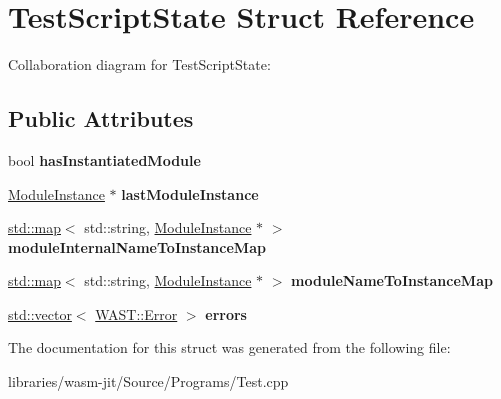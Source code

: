 \hypertarget{struct_test_script_state}{}\section{Test\+Script\+State Struct Reference}
\label{struct_test_script_state}


Collaboration diagram for Test\+Script\+State\+:
\subsection*{Public Attributes}
\begin{DoxyCompactItemize}
\item 
\mbox{\label{struct_test_script_state_a46c0055afd843d498fbfb027ca3507f1}} 
bool {\bfseries has\+Instantiated\+Module}
\item 
\mbox{\label{struct_test_script_state_a4296aff54ac0a1ad69cd8c31860a3ae2}} 
\mbox{\hyperlink{struct_runtime_1_1_module_instance}{Module\+Instance}} $\ast$ {\bfseries last\+Module\+Instance}
\item 
\mbox{\label{struct_test_script_state_a6f6249f8cf4150e64548344e0c038642}} 
\mbox{\hyperlink{classstd_1_1map}{std\+::map}}$<$ std\+::string, \mbox{\hyperlink{struct_runtime_1_1_module_instance}{Module\+Instance}} $\ast$ $>$ {\bfseries module\+Internal\+Name\+To\+Instance\+Map}
\item 
\mbox{\label{struct_test_script_state_a0c8b55e9e522334e2e9e8e3a95cc2cff}} 
\mbox{\hyperlink{classstd_1_1map}{std\+::map}}$<$ std\+::string, \mbox{\hyperlink{struct_runtime_1_1_module_instance}{Module\+Instance}} $\ast$ $>$ {\bfseries module\+Name\+To\+Instance\+Map}
\item 
\mbox{\label{struct_test_script_state_a9a5f404868684de7d298c4edfef0d807}} 
\mbox{\hyperlink{classstd_1_1vector}{std\+::vector}}$<$ \mbox{\hyperlink{struct_w_a_s_t_1_1_error}{W\+A\+S\+T\+::\+Error}} $>$ {\bfseries errors}
\end{DoxyCompactItemize}


The documentation for this struct was generated from the following file\+:\begin{DoxyCompactItemize}
\item 
libraries/wasm-\/jit/\+Source/\+Programs/Test.\+cpp\end{DoxyCompactItemize}
